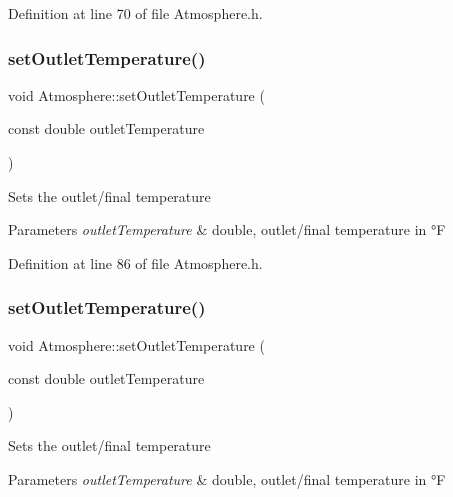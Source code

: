 Definition at line 70 of file Atmosphere.\+h.

\mbox{\label{class_atmosphere_a8f6589ab4e17d3c531bb7e0e771f4f80}} 
\subsubsection{\texorpdfstring{set\+Outlet\+Temperature()}{setOutletTemperature()}\hspace{0.1cm}{\footnotesize\ttfamily [1/3]}}
{\footnotesize\ttfamily void Atmosphere\+::set\+Outlet\+Temperature (\begin{DoxyParamCaption}\item[{const double}]{outlet\+Temperature }\end{DoxyParamCaption})\hspace{0.3cm}{\ttfamily [inline]}}

Sets the outlet/final temperature 
\begin{DoxyParams}{Parameters}
{\em outlet\+Temperature} & double, outlet/final temperature in °F \\
\hline
\end{DoxyParams}


Definition at line 86 of file Atmosphere.\+h.

\mbox{\label{class_atmosphere_a8f6589ab4e17d3c531bb7e0e771f4f80}} 
\subsubsection{\texorpdfstring{set\+Outlet\+Temperature()}{setOutletTemperature()}\hspace{0.1cm}{\footnotesize\ttfamily [2/3]}}
{\footnotesize\ttfamily void Atmosphere\+::set\+Outlet\+Temperature (\begin{DoxyParamCaption}\item[{const double}]{outlet\+Temperature }\end{DoxyParamCaption})\hspace{0.3cm}{\ttfamily [inline]}}

Sets the outlet/final temperature 
\begin{DoxyParams}{Parameters}
{\em outlet\+Temperature} & double, outlet/final temperature in °F \\
\hline
\end{DoxyParams}


